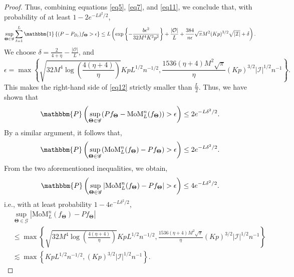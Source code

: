 \documentclass[12pt]{article}
\newcommand{\bTheta}{\boldsymbol{\Theta}}
\newcommand{\I}{\mathcal{I}}
\newcommand{\cO}{\mathcal{O}}
\newcommand{\sP}{\mathbbm{P}}
\newcommand{\one}{\mathbbm{1}}
\begin{document}
\begin{proof}
Thus, combining equations \eqref{eq5}, \eqref{eq7}, and \eqref{eq11}, we conclude that,  with probability of at least $1-2e^{-L \delta^2/2}$, 
\begin{equation}
    \sup_{\bTheta \in \mathscr{G}}\sum_{\ell = 1}^L \one\left\{(P-P_{B_\ell})f_{\bTheta} > \epsilon\right\} \le  L \left( \exp\left\{-\frac{b \epsilon^2}{32  M^4 K^2 p^2}\right\}+ \frac{|\cO|}{L} + \frac{384}{n \epsilon}  \sqrt{\pi} M^2  (Kp)^{3/2} \sqrt{|\I|} + \delta\right). \label{eq12}
\end{equation}
We choose $\delta = \frac{2}{4+\eta} - \frac{|\cO|}{L}$, and $$\epsilon = \max\left\{\sqrt{32  M^4 \log\left(\frac{4(\eta+4)}{\eta}\right)}KpL^{1/2}n^{-1/2}, \frac{1536(\eta+4)  M^2 \sqrt{\pi}}{\eta} (Kp)^{3/2} |\I|^{1/2}n^{-1}\right\}.$$ This makes the right-hand side of \eqref{eq12} strictly smaller than $\frac{L}{2}$.
Thus, we have shown that 
\begin{align*}
     \sP\left( \sup_{\bTheta \in \mathscr{G}} (Pf_{\bTheta} - \text{MoM}^n_L (f_{\bTheta}))> \epsilon \right) \le 2e^{-L \delta^2/2}.
 \end{align*}
By a similar argument, it follows that,
\begin{align*}
    \sP\left( \sup_{\bTheta \in \mathscr{G}} (\text{MoM}^n_L (f_{\bTheta}) -Pf_{\bTheta} ) > \epsilon \right) \le 2e^{-L \delta^2/2}.
\end{align*}
From the two aforementioned inequalities, we obtain, 
\[\sP\left( \sup_{\bTheta \in \mathscr{G}} |\text{MoM}^n_L (f_{\bTheta}) -Pf_{\bTheta} | > \epsilon \right) \le 4e^{-L \delta^2/2}.\]
i.e., with at least probability $1-4e^{-L \delta^2/2}$,
\begin{align*}
    & \sup_{\bTheta \in \mathscr{G}} |\text{MoM}^n_L (f_{\bTheta}) -Pf_{\bTheta} | \\
    &\le \max\left\{\sqrt{32  M^4 \log\left(\frac{4(\eta+4)}{\eta}\right)}KpL^{1/2}n^{-1/2}, \frac{1536(\eta+4)  M^2 \sqrt{\pi}}{\eta} (Kp)^{3/2} |\I|^{1/2}n^{-1}\right\}\\
    &\lesssim \max\left\{ KpL^{1/2}n^{-1/2}, (Kp)^{3/2}  |\I|^{1/2}n^{-1}\right\}.
\end{align*}
\end{proof}
\end{document}
